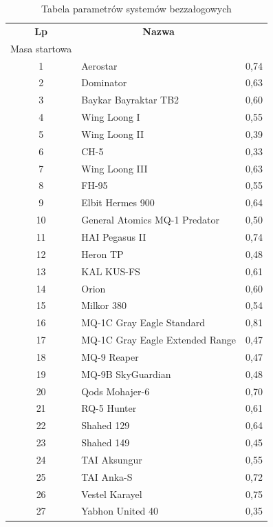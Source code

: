 \documentclass[
    bindingoffset=5mm,
    footnoteindent=3mm,
    hyphenation=true    
]{src/wut-thesis}
\begin{document}
\begin{longtable}{| c | m{0,5\linewidth} | c |}
    \caption{Tabela parametrów systemów bezzałogowych}
    \label{table:mass_ratio} \\
    \hline
    \textbf{Lp} & \multicolumn{1}{c|}{\textbf{Nazwa}} & \textbf{\begin{tabular}[c]{@{}c@{}}Masa własna/\\ Masa startowa\end{tabular}} \\ \hline \hline
    \endfirsthead
    
    \hline
    \endfoot
    
    1 & Aerostar & 0,74 \\ \hline
    2 & Dominator & 0,63 \\ \hline
    3 & Baykar Bayraktar TB2 & 0,60 \\ \hline
    4 & Wing Loong I & 0,55 \\ \hline
    5 & Wing Loong II & 0,39 \\ \hline
    6 & CH-5 & 0,33 \\ \hline
    7 & Wing Loong III & 0,63 \\ \hline
    8 & FH-95 & 0,55 \\ \hline
    9 & Elbit Hermes 900 & 0,64 \\ \hline
    10 & General Atomics MQ-1 Predator & 0,50 \\ \hline
    11 & HAI Pegasus II & 0,74 \\ \hline
    12 & Heron TP & 0,48 \\ \hline
    13 & KAL KUS-FS & 0,61 \\ \hline
    14 & Orion & 0,60 \\ \hline
    15 & Milkor 380 & 0,54 \\ \hline
    16 & MQ-1C Gray Eagle Standard & 0,81 \\ \hline
    17 & MQ-1C Gray Eagle Extended Range & 0,47 \\ \hline
    18 & MQ-9 Reaper & 0,47 \\ \hline
    19 & MQ-9B SkyGuardian & 0,48 \\ \hline
    20 & Qods Mohajer-6 & 0,70 \\ \hline
    21 & RQ-5 Hunter & 0,61 \\ \hline
    22 & Shahed 129 & 0,64 \\ \hline
    23 & Shahed 149 & 0,45 \\ \hline
    24 & TAI Aksungur & 0,55 \\ \hline
    25 & TAI Anka-S & 0,72 \\ \hline
    26 & Vestel Karayel & 0,75 \\ \hline
    27 & Yabhon United 40 & 0,35 \\ \hline
\end{longtable}
\clearpage
{}


\end{document}
